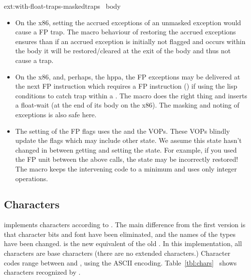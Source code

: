 \begin{defmac}{ext:}{with-float-traps-masked}{traps \ampbody\ body}
\begin{itemize}
  \item On the x86, setting the accrued exceptions of an unmasked
    exception would cause a FP trap. The macro behaviour of restoring
    the accrued exceptions ensures than if an accrued exception is
    initially not flagged and occurs within the body it will be
    restored/cleared at the exit of the body and thus not cause a
    trap.
    
  \item On the x86, and, perhaps, the hppa, the FP exceptions may be
    delivered at the next FP instruction which requires a FP
     instruction () if using the lisp
    conditions to catch trap within a .  The
     macro does the right thing and inserts a
    float-wait (at the end of its body on the x86).  The masking and
    noting of exceptions is also safe here.
    
  \item The setting of the FP flags uses the
     and the  VOPs. These VOPs blindly update
    the flags which may include other state.  We assume this state
    hasn't changed in between getting and setting the state. For
    example, if you used the FP unit between the above calls, the
    state may be incorrectly restored! The
     macro keeps the intervening code to
    a minimum and uses only integer operations.
  \end{itemize}

\end{defmac}


\subsection{Characters}

\cmucl{} implements characters according to \cltltwo{}. The
main difference from the first version is that character bits and font
have been eliminated, and the names of the types have been changed.
 is the new equivalent of the old
. In this implementation, all characters are
base characters (there are no extended characters.) Character codes
range between  and , using the ASCII encoding.
Table~\ref{tbl:chars}~ shows characters recognized
by \cmucl.

